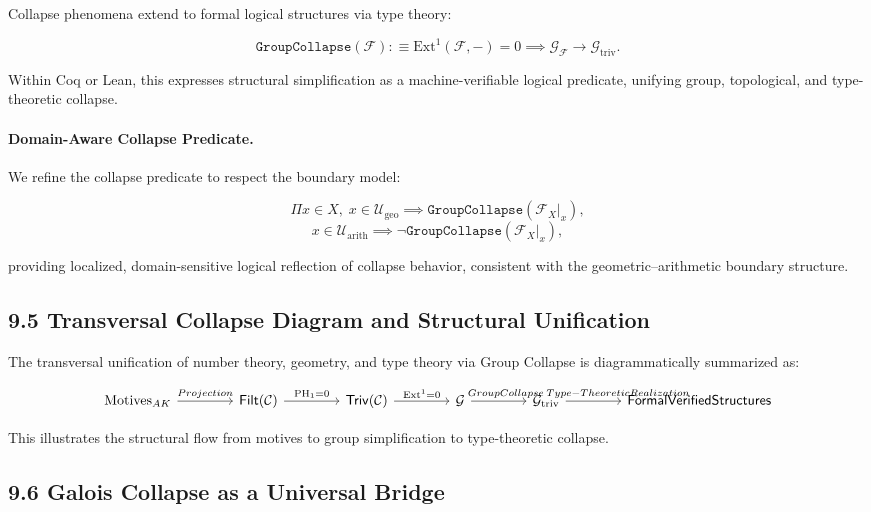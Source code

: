 \documentclass[11pt]{article}
\begin{document}
Collapse phenomena extend to formal logical structures via type theory:

\[
\texttt{GroupCollapse}(\mathcal{F}) :\equiv \mathrm{Ext}^1(\mathcal{F}, -) = 0 \implies \mathcal{G}_{\mathcal{F}} \longrightarrow \mathcal{G}_{\mathrm{triv}}.
\]

Within Coq or Lean, this expresses structural simplification as a machine-verifiable logical predicate, unifying group, topological, and type-theoretic collapse.

\paragraph{Domain-Aware Collapse Predicate.}

We refine the collapse predicate to respect the boundary model:

\[
\Pi x \in X,\;
x \in \mathcal{U}_{\mathrm{geo}} \implies \texttt{GroupCollapse}(\mathcal{F}_X|_x),
\]
\[
x \in \mathcal{U}_{\mathrm{arith}} \implies \neg \texttt{GroupCollapse}(\mathcal{F}_X|_x),
\]

providing localized, domain-sensitive logical reflection of collapse behavior, consistent with the geometric–arithmetic boundary structure.


\subsection*{9.5 Transversal Collapse Diagram and Structural Unification}

The transversal unification of number theory, geometry, and type theory via Group Collapse is diagrammatically summarized as:

\[
\begin{tikzcd}[column sep=4em]
\mathrm{Motives}_{AK} \arrow[r, "Projection"]
& \mathsf{Filt}(\mathcal{C}) \arrow[r, "\mathrm{PH}_1 = 0"]
& \mathsf{Triv}(\mathcal{C}) \arrow[r, "\mathrm{Ext}^1 = 0"]
& \mathcal{G} \arrow[r, "\hspace{1em}Group Collapse"]
& \mathcal{G}_{\mathrm{triv}} \arrow[r, "\hspace{3.5em}Type-Theoretic Realization"]
& \mathsf{Formal Verified Structures}
\end{tikzcd}
\]


This illustrates the structural flow from motives to group simplification to type-theoretic collapse.

\subsection*{9.6 Galois Collapse as a Universal Bridge}
\end{document}
